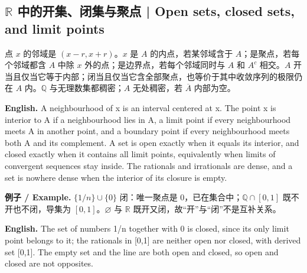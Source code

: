 \documentclass[UTF8,11pt,a4paper]{ctexart}
\newcommand{\EN}[1]{\par\noindent\textbf{English.} #1\par}
\let\APSsubsection\subsection
\renewcommand{\subsection}[1]{\Needspace{6\baselineskip}\APSsubsection{#1}}
\newcommand{\EX}[2]{\par\noindent\textbf{例子 / Example.} #1\par\EN{#2}}
\begin{document}
\subsection{\texorpdfstring{$\mathbb R$}{R} 中的开集、闭集与聚点 | Open sets, closed sets, and limit points}
\noindent 点 $x$ 的邻域是 $(x-r,x+r)$。$x$ 是 $A$ 的内点，若某邻域含于 $A$；是聚点，若每个邻域都含 $A$ 中除 $x$ 外的点；是边界点，若每个邻域同时与 $A$ 和 $A^c$ 相交。$A$ 开当且仅当它等于内部；闭当且仅当它含全部聚点，也等价于其中收敛序列的极限仍在 $A$ 内。$\mathbb Q$ 与无理数集都稠密；$A$ 无处稠密，若 $\overline A$ 内部为空。
\EN{A neighbourhood of x is an interval centered at x. The point x is interior to A if a neighbourhood lies in A, a limit point if every neighbourhood meets A in another point, and a boundary point if every neighbourhood meets both A and its complement. A set is open exactly when it equals its interior, and closed exactly when it contains all limit points, equivalently when limits of convergent sequences stay inside. The rationals and irrationals are dense, and a set is nowhere dense when the interior of its closure is empty.}
\EX{$\{1/n\}\cup\{0\}$ 闭：唯一聚点是 $0$，已在集合中；$\mathbb Q\cap[0,1]$ 既不开也不闭，导集为 $[0,1]$。$\varnothing$ 与 $\mathbb R$ 既开又闭，故“开”与“闭”不是互补关系。}{The set of numbers 1/n together with 0 is closed, since its only limit point belongs to it; the rationals in [0,1] are neither open nor closed, with derived set [0,1]. The empty set and the line are both open and closed, so open and closed are not opposites.}
\end{document}
